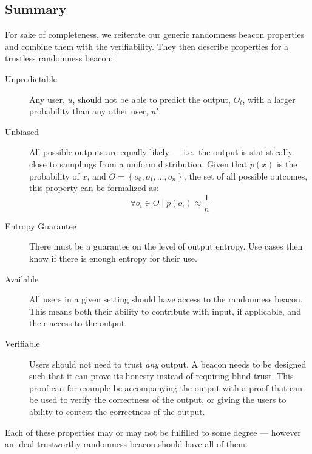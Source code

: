 \subsection{Summary}

For sake of completeness, we reiterate our generic randomness beacon properties and combine them with the verifiability.
They then describe properties for a trustless randomness beacon:

\begin{description}
    \item[Unpredictable]
        Any user, $u$, should not be able to predict the output, $O_t$, with a larger probability than any other user, $u'$.
    \item[Unbiased]
        All possible outputs are equally likely --- i.e.\ the output is statistically close to samplings from a uniform distribution.
        Given that $p(x)$ is the probability of $x$, and $O = \left\{ {o_0, o_1, \ldots, o_n} \right\}$, the set of all possible outcomes, this property can be formalized as:
        $$ \forall o_i \in O \mid p(o_i) \approx \frac{1}{n}$$
    \item[Entropy Guarantee]
        There must be a guarantee on the level of output entropy.
        Use cases then know if there is enough entropy for their use.
    \item[Available]
        All users in a given setting should have access to the randomness beacon.
        This means both their ability to contribute with input, if applicable, and their access to the output.
    \item[Verifiable]
        Users should not need to trust \emph{any} output.
        A beacon needs to be designed such that it can prove its honesty instead of requiring blind trust.
        This proof can for example be accompanying the output with a proof that can be used to verify the correctness of the output, or giving the users to ability to contest the correctness of the output.
\end{description}

Each of these properties may or may not be fulfilled to some degree --- however an ideal trustworthy randomness beacon should have all of them.


